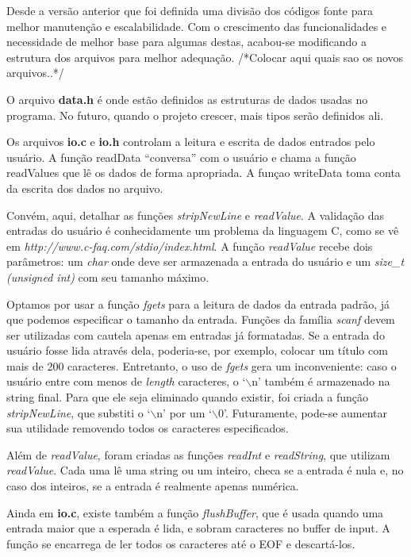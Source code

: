 \documentclass{article}
\begin{document}
Desde a versão anterior que foi definida uma divisão dos códigos fonte para melhor manutenção e escalabilidade. Com o crescimento das funcionalidades e necessidade de melhor base para algumas destas, acabou-se modificando a estrutura dos arquivos para melhor adequação. /*Colocar aqui quais sao os novos arquivos..*/

O arquivo \textbf{data.h} é onde estão definidos as estruturas de dados usadas no programa. No futuro, quando o projeto crescer, mais tipos serão definidos ali.

Os arquivos \textbf{io.c} e \textbf{io.h} controlam a leitura e escrita de dados entrados pelo usuário. A função readData ``conversa'' com o usuário e chama a função readValues que lê os dados de forma apropriada. A funçao writeData toma conta da escrita dos dados no arquivo.

Convém, aqui, detalhar as funções \textit{stripNewLine} e \textit{readValue}. A validação das entradas do usuário é conhecidamente um problema da linguagem C, como se vê em \textit{http://www.c-faq.com/stdio/index.html}. A função \textit{readValue} recebe dois parâmetros: um \textit{char} onde deve ser armazenada a entrada do usuário e um \textit{size\_t (unsigned int)} com seu tamanho máximo.

Optamos por usar a função \textit{fgets} para a leitura de dados da entrada padrão, já que podemos especificar o tamanho da entrada. Funções da família \textit{scanf} devem ser utilizadas com cautela apenas em entradas já formatadas. Se a entrada do usuário fosse lida através dela, poderia-se, por exemplo, colocar um título com mais de 200 caracteres. Entretanto, o uso de \textit{fgets} gera um inconveniente: caso o usuário entre com menos de \textit{length} caracteres, o `$\backslash$n' também é armazenado na string final. Para que ele seja eliminado quando existir, foi criada a função \textit{stripNewLine}, que substiti o `$\backslash$n' por um `$\backslash$0'. Futuramente, pode-se aumentar sua utilidade removendo todos os caracteres especificados.

Além de \textit{readValue}, foram criadas as funções \textit{readInt} e \textit{readString}, que utilizam \textit{readValue}. Cada uma lê uma string ou um inteiro, checa se a entrada é nula e, no caso dos inteiros, se a entrada é realmente apenas numérica.

Ainda em \textbf{io.c}, existe também a função \textit{flushBuffer}, que é usada quando uma entrada maior que a esperada é lida, e sobram caracteres no buffer de input. A função se encarrega de ler todos os caracteres até o EOF e descartá-los.
\end{document}
